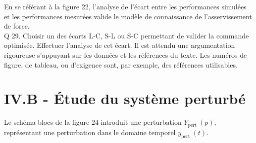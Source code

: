 \documentclass[10pt]{article}
\begin{document}
En se référant à la figure 22, l'analyse de l'écart entre les performances simulées et les performances mesurées valide le modèle de connaissance de l'asservissement de force.\\
Q 29. Choisir un des écarts L-C, S-L ou S-C permettant de valider la commande optimisée. Effectuer l'analyse de cet écart. Il est attendu une argumentation rigoureuse s'appuyant sur les données et les références du texte. Les numéros de figure, de tableau, ou d'exigence sont, par exemple, des références utilisables.

\section{IV.B - Étude du système perturbé}
Le schéma-blocs de la figure 24 introduit une perturbation $Y_{\text {pert }}(p)$, représentant une perturbation dans le domaine temporel $y_{\text {pert }}(t)$.
\end{document}
